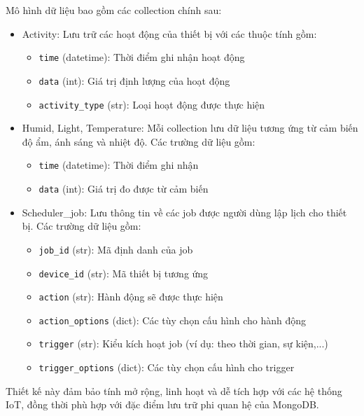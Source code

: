 Mô hình dữ liệu bao gồm các collection chính sau:
\begin{itemize}
    \item Activity: Lưu trữ các hoạt động của thiết bị với các thuộc tính gồm:
    \begin{itemize}
        \item \texttt{time} (datetime): Thời điểm ghi nhận hoạt động
        \item \texttt{data} (int): Giá trị định lượng của hoạt động
        \item \texttt{activity\_type} (str): Loại hoạt động được thực hiện
    \end{itemize}
    
    \item Humid, Light, Temperature: Mỗi collection lưu dữ liệu tương ứng từ cảm biến độ ẩm, ánh sáng và nhiệt độ. Các trường dữ liệu gồm:
    \begin{itemize}
        \item \texttt{time} (datetime): Thời điểm ghi nhận
        \item \texttt{data} (int): Giá trị đo được từ cảm biến
    \end{itemize}

    \item Scheduler\_job: Lưu thông tin về các job được người dùng lập lịch cho thiết bị. Các trường dữ liệu gồm:
    \begin{itemize}
        \item \texttt{job\_id} (str): Mã định danh của job
        \item \texttt{device\_id} (str): Mã thiết bị tương ứng
        \item \texttt{action} (str): Hành động sẽ được thực hiện
        \item \texttt{action\_options} (dict): Các tùy chọn cấu hình cho hành động
        \item \texttt{trigger} (str): Kiểu kích hoạt job (ví dụ: theo thời gian, sự kiện,...)
        \item \texttt{trigger\_options} (dict): Các tùy chọn cấu hình cho trigger
    \end{itemize}
\end{itemize}

Thiết kế này đảm bảo tính mở rộng, linh hoạt và dễ tích hợp với các hệ thống IoT, đồng thời phù hợp với đặc điểm lưu trữ phi quan hệ của MongoDB.

\newpage


